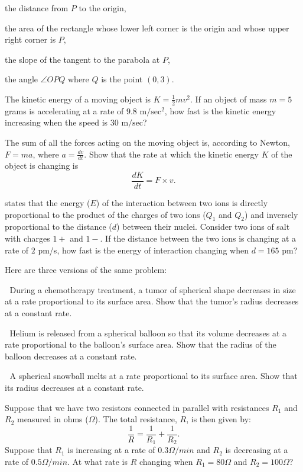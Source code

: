 \begin{multicols}{2}
\subprob the distance from $P$ to the origin,

\subprob the area of the rectangle whose lower left corner is the origin
and whose upper right corner is $P$,

\subprob the slope of the tangent to the parabola at $P$,

\subprob the angle $\angle OPQ$ where $Q$ is the point $(0, 3)$.

\problem \subprob The kinetic energy of a moving object is $K=\frac{1}{2}mv^2$.
If an object of mass $m=5$ grams is accelerating at a rate of $9.8$
$\textrm{m}/{\textrm{sec}^2}$, how fast is the kinetic energy increasing when
the speed is $30$ $\textrm{m}/\textrm{sec}$?

\subprob The sum of all the forces acting on the moving object is, according to
Newton, $F=ma$, where $a = \frac{dv}{dt}$.  Show that the rate at which the
kinetic energy $K$ of the object is changing is
\[
  \frac{dK}{dt} = F\times v.
\]

 states that the energy ($E$) of the interaction
between two ions is directly proportional to the product of the charges of two
ions ($Q_1$ and $Q_2$) and inversely proportional to the distance ($d$) between
their nuclei. Consider two ions of salt with charges $1+$ and $1-$. If the
distance between the two ions is changing at a rate of $2$ pm/s, how fast is the
energy of interaction changing when $d=165$ pm?


\problem  Here are three versions of the same problem:
\begin{trivlist}
\item   During a chemotherapy treatment, a tumor of spherical shape
  decreases in size at a rate proportional to its surface area. Show that
  the tumor's radius decreases at a constant rate.

\item  Helium is released from a spherical balloon so that its volume
  decreases at a rate proportional to the balloon's surface area.  Show
  that the radius of the balloon decreases at a constant rate.

\item  A spherical snowball melts at a rate proportional to its
  surface area. Show that its radius decreases at a constant rate.
\end{trivlist}

\problem Suppose that we have two resistors connected in parallel with
resistances $R_1$ and $R_2$ measured in ohms ($\Omega$).  The total
resistance, $R$, is then given by:
\[
  \frac{1}{R}=\frac{1}{R_1}+\frac{1}{R_2}.
\]
Suppose that $R_1$ is increasing at a rate of $0.3 \Omega/min$ and $R_2$
is decreasing at a rate of $0.5 \Omega/min$.  At what rate is $R$
changing when $R_1=80 \Omega$ and $R_2=100 \Omega$?



\end{multicols}

